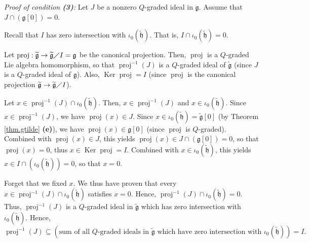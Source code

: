 \documentclass[etingof-lie.tex]{subfiles}
\begin{document}
\textit{Proof of condition \textbf{(3)}:} Let $J$ be a nonzero $Q$-graded
ideal in $\mathfrak{g}$. Assume that $J\cap\left(  \mathfrak{g}\left[
0\right]  \right)  =0$.

Recall that $I$ has zero intersection with $\iota_{0}\left(
\widetilde{\mathfrak{h}}\right)  $. That is, $I\cap\iota_{0}\left(
\widetilde{\mathfrak{h}}\right)  =0$.

Let $\operatorname*{proj}:\widetilde{\mathfrak{g}}\rightarrow
\widetilde{\mathfrak{g}}\diagup I=\mathfrak{g}$ be the canonical projection.
Then, $\operatorname*{proj}$ is a $Q$-graded Lie algebra homomorphism, so that
$\operatorname*{proj}\nolimits^{-1}\left(  J\right)  $ is a $Q$-graded ideal
of $\widetilde{\mathfrak{g}}$ (since $J$ is a $Q$-graded ideal of
$\mathfrak{g}$). Also, $\operatorname*{Ker}\operatorname*{proj}=I$ (since
$\operatorname*{proj}$ is the canonical projection $\widetilde{\mathfrak{g}%
}\rightarrow\widetilde{\mathfrak{g}}\diagup I$).

Let $x\in\operatorname*{proj}\nolimits^{-1}\left(  J\right)  \cap\iota
_{0}\left(  \widetilde{\mathfrak{h}}\right)  $. Then, $x\in
\operatorname*{proj}\nolimits^{-1}\left(  J\right)  $ and $x\in\iota
_{0}\left(  \widetilde{\mathfrak{h}}\right)  $. Since $x\in
\operatorname*{proj}\nolimits^{-1}\left(  J\right)  $, we have
$\operatorname*{proj}\left(  x\right)  \in J$. Since $x\in\iota_{0}\left(
\widetilde{\mathfrak{h}}\right)  =\widetilde{\mathfrak{g}}\left[  0\right]  $
(by Theorem \ref{thm.gtilde} \textbf{(e)}), we have $\operatorname*{proj}%
\left(  x\right)  \in\mathfrak{g}\left[  0\right]  $ (since
$\operatorname*{proj}$ is $Q$-graded). Combined with $\operatorname*{proj}%
\left(  x\right)  \in J$, this yields $\operatorname*{proj}\left(  x\right)
\in J\cap\left(  \mathfrak{g}\left[  0\right]  \right)  =0$, so that
$\operatorname*{proj}\left(  x\right)  =0$, thus $x\in\operatorname*{Ker}%
\operatorname*{proj}=I$. Combined with $x\in\iota_{0}\left(
\widetilde{\mathfrak{h}}\right)  $, this yields $x\in I\cap\left(  \iota
_{0}\left(  \widetilde{\mathfrak{h}}\right)  \right)  =0$, so that $x=0$.

Forget that we fixed $x$. We thus have proven that every $x\in
\operatorname*{proj}\nolimits^{-1}\left(  J\right)  \cap\iota_{0}\left(
\widetilde{\mathfrak{h}}\right)  $ satisfies $x=0$. Hence,
$\operatorname*{proj}\nolimits^{-1}\left(  J\right)  \cap\iota_{0}\left(
\widetilde{\mathfrak{h}}\right)  =0$. Thus, $\operatorname*{proj}%
\nolimits^{-1}\left(  J\right)  $ is a $Q$-graded ideal in
$\widetilde{\mathfrak{g}}$ which has zero intersection with $\iota_{0}\left(
\widetilde{\mathfrak{h}}\right)  $. Hence,%
\[
\operatorname*{proj}\nolimits^{-1}\left(  J\right)  \subseteq\left(  \text{sum
of all }Q\text{-graded ideals in }\widetilde{\mathfrak{g}}\text{ which have
zero intersection with }\iota_{0}\left(  \widetilde{\mathfrak{h}}\right)
\right)  =I.
\]
\end{document}
